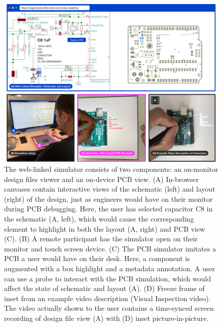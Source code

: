\documentclass [11pt, proquest] {uwthesis}[2020/02/24]
\begin{document}
\begin{figure}%
    \centering
    \includegraphics[width=0.9\linewidth]{AS_figures/Procedure-Part1/Figure-full-setup.jpg}
    \caption{The web-linked simulator consists of two components: an on-monitor design files viewer and an on-device PCB view. (A) In-browser canvases contain interactive views of the schematic (left) and layout (right) of the design, just as engineers would have on their monitor during PCB debugging. Here, the user has selected capacitor C8 in the schematic (A, left), which would cause the corresponding element to highlight in both the layout (A, right) and PCB view (C). (B) A remote participant has the simulator open on their monitor and touch screen device. (C) The PCB simulator imitates a PCB a user would have on their desk. Here, a component is augmented with a box highlight and a metadata annotation. A user can use a probe to interact with the PCB simulation, which would affect the state of schematic and layout (A). (D) Freeze frame of inset from an example video description (Visual Inspection video). The video actually shown to the user contains a time-synced screen recording of design file view (A) with (D) inset picture-in-picture.}
    \label{fig:Procedure-Part1}
   
\end{figure}

\end{document}
